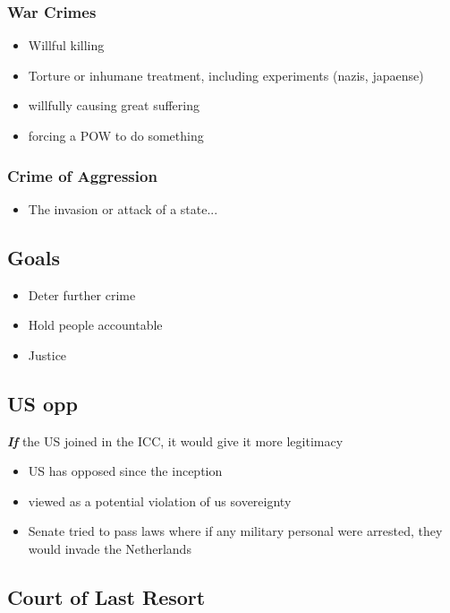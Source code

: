 \documentclass{article}
\begin{document}
\subsubsection{War Crimes}
\begin{itemize}
    \item Willful killing
    \item Torture or inhumane treatment, including experiments (nazis, japaense)
    \item willfully causing great suffering
    \item forcing a POW to do something
\end{itemize}

\subsubsection{Crime of Aggression}
\begin{itemize}
    \item The invasion or attack of a state... %
\end{itemize}

\subsection{Goals}
\begin{itemize}
    \item Deter further crime
    \item Hold people accountable
    \item Justice
\end{itemize}

\subsection{US opp}

\textbf{\textit{If}} the US joined in the ICC, it would give it more legitimacy

\begin{itemize}
    \item US has opposed since the inception
    \item viewed as a potential violation of us sovereignty 
    \item Senate tried to pass laws where if any military personal were arrested, they would invade the Netherlands 
\end{itemize}

\subsection{Court of Last Resort}
\end{document}
